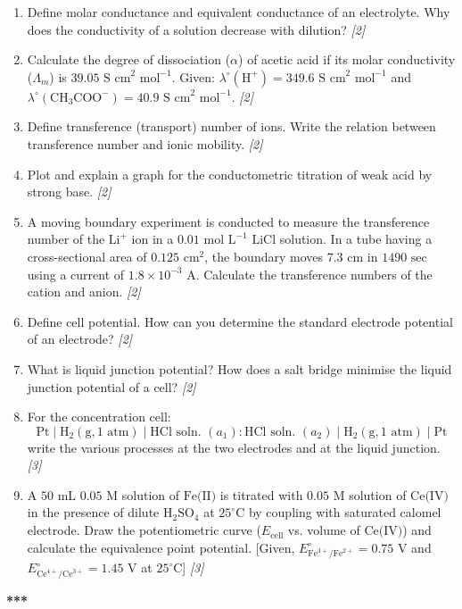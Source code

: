 \documentclass[11pt,a4paper]{article}
\newcommand{\pts}[1]{\hfill \textit{[#1]}}
\begin{document}
\begin{enumerate}[label=\textbf{\arabic*.},leftmargin=*,itemsep=12pt]

  \item Define molar conductance and equivalent conductance of an electrolyte. Why does the conductivity of a solution decrease with dilution? \pts{2}

  \item Calculate the degree of dissociation ($\alpha$) of acetic acid if its molar conductivity ($\Lambda_m$) is $39.05\text{ S cm}^2\text{ mol}^{-1}$. Given: $\lambda^\circ(\text{H}^+) = 349.6\text{ S cm}^2\text{ mol}^{-1}$ and $\lambda^\circ(\text{CH}_3\text{COO}^-) = 40.9\text{ S cm}^2\text{ mol}^{-1}$. \pts{2}

  \item Define transference (transport) number of ions. Write the relation between transference number and ionic mobility. \pts{2}

  \item Plot and explain a graph for the conductometric titration of weak acid by strong base. \pts{2}

  \item A moving boundary experiment is conducted to measure the transference number of the $\text{Li}^+$ ion in a $0.01\text{ mol L}^{-1}$ $\text{LiCl}$ solution. In a tube having a cross-sectional area of $0.125\text{ cm}^2$, the boundary moves $7.3\text{ cm}$ in $1490\text{ sec}$ using a current of $1.8 \times 10^{-3}\text{ A}$. Calculate the transference numbers of the cation and anion. \pts{2}

  \item Define cell potential. How can you determine the standard electrode potential of an electrode? \pts{2}

  \item What is liquid junction potential? How does a salt bridge minimise the liquid junction potential of a cell? \pts{2}

  \item For the concentration cell:
  \[
    \text{Pt} \mid \text{H}_2(\text{g}, 1\text{ atm}) \mid \text{HCl soln. } (a_1) : \text{HCl soln. } (a_2) \mid \text{H}_2(\text{g}, 1\text{ atm}) \mid \text{Pt}
  \]
  write the various processes at the two electrodes and at the liquid junction. \pts{3}

  \item A $50\text{ mL}$ $0.05\text{ M}$ solution of $\text{Fe(II)}$ is titrated with $0.05\text{ M}$ solution of $\text{Ce(IV)}$ in the presence of dilute $\text{H}_2\text{SO}_4$ at $25^\circ\text{C}$ by coupling with saturated calomel electrode. Draw the potentiometric curve ($E_{\text{cell}}$ vs. volume of $\text{Ce(IV)}$) and calculate the equivalence point potential. [Given, $E^\circ_{\text{Fe}^{3+}/\text{Fe}^{2+}} = 0.75\text{ V}$ and $E^\circ_{\text{Ce}^{4+}/\text{Ce}^{3+}} = 1.45\text{ V}$ at $25^\circ\text{C}$] \pts{3}

\end{enumerate}

\bigskip
\begin{center}
  \textbf{***}
\end{center}
\end{document}

